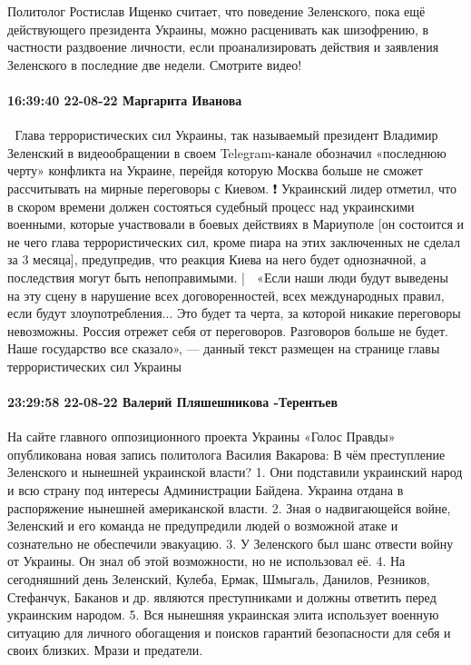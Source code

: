Политолог Ростислав Ищенко считает, что поведение Зеленского, пока ещё
действующего президента Украины, можно расценивать как шизофрению, в частности
раздвоение личности, если проанализировать действия и заявления Зеленского в
последние две недели.
Смотрите видео!

\paragraph{16:39:40 22-08-22 Маргарита Иванова}

📢 Глава террористических сил Украины, так называемый президент Владимир Зеленский в видеообращении в своем Telegram-канале обозначил «последнюю черту» конфликта на Украине, перейдя которую Москва больше не сможет рассчитывать на мирные переговоры с Киевом.
❗ Украинский лидер отметил, что в скором времени должен состояться судебный процесс над украинскими военными, которые участвовали в боевых действиях в Мариуполе [он состоится и не чего глава террористических сил, кроме пиара на этих заключенных не сделал за 3 месяца], предупредив, что реакция Киева на него будет однозначной, а последствия могут быть непоправимыми.
| 📰 «Если наши люди будут выведены на эту сцену в нарушение всех договоренностей, всех международных правил, если будут злоупотребления... Это будет та черта, за которой никакие переговоры невозможны. Россия отрежет себя от переговоров. Разговоров больше не будет. Наше государство все сказало», — данный текст размещен на странице главы террористических сил Украины


\paragraph{23:29:58 22-08-22 Валерий Пляшешникова -Терентьев}

На сайте главного оппозиционного проекта Украины «Голос Правды» опубликована новая запись политолога Василия Вакарова:
В чём преступление Зеленского и нынешней украинской власти?
1. Они подставили украинский народ и всю страну под интересы Администрации Байдена. Украина отдана в распоряжение нынешней американской власти.
2. Зная о надвигающейся войне, Зеленский и его команда не предупредили людей о возможной атаке и сознательно не обеспечили эвакуацию.
3. У Зеленского был шанс отвести войну от Украины. Он знал об этой возможности, но не использовал её.
4. На сегодняшний день Зеленский, Кулеба, Ермак, Шмыгаль, Данилов, Резников, Стефанчук, Баканов и др. являются преступниками и должны ответить перед украинским народом.
5. Вся нынешняя украинская элита использует военную ситуацию для личного обогащения и поисков гарантий безопасности для себя и своих близких.
Мрази и предатели.



